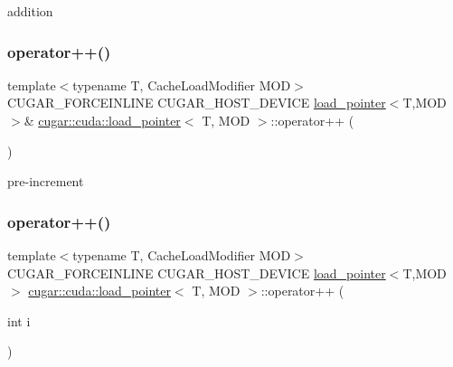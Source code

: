 addition \mbox{\label{structcugar_1_1cuda_1_1load__pointer_a404a1717ac8b334bdc235f523023a7a4}} 
\subsubsection{\texorpdfstring{operator++()}{operator++()}\hspace{0.1cm}{\footnotesize\ttfamily [1/2]}}
{\footnotesize\ttfamily template$<$typename T, Cache\+Load\+Modifier M\+OD$>$ \\
C\+U\+G\+A\+R\+\_\+\+F\+O\+R\+C\+E\+I\+N\+L\+I\+NE C\+U\+G\+A\+R\+\_\+\+H\+O\+S\+T\+\_\+\+D\+E\+V\+I\+CE \hyperlink{structcugar_1_1cuda_1_1load__pointer}{load\+\_\+pointer}$<$T,M\+OD$>$\& \hyperlink{structcugar_1_1cuda_1_1load__pointer}{cugar\+::cuda\+::load\+\_\+pointer}$<$ T, M\+OD $>$\+::operator++ (\begin{DoxyParamCaption}{ }\end{DoxyParamCaption})\hspace{0.3cm}{\ttfamily [inline]}}

pre-\/increment \mbox{\label{structcugar_1_1cuda_1_1load__pointer_ad5e951fdcb006c251a6402d085b77bdf}} 
\subsubsection{\texorpdfstring{operator++()}{operator++()}\hspace{0.1cm}{\footnotesize\ttfamily [2/2]}}
{\footnotesize\ttfamily template$<$typename T, Cache\+Load\+Modifier M\+OD$>$ \\
C\+U\+G\+A\+R\+\_\+\+F\+O\+R\+C\+E\+I\+N\+L\+I\+NE C\+U\+G\+A\+R\+\_\+\+H\+O\+S\+T\+\_\+\+D\+E\+V\+I\+CE \hyperlink{structcugar_1_1cuda_1_1load__pointer}{load\+\_\+pointer}$<$T,M\+OD$>$ \hyperlink{structcugar_1_1cuda_1_1load__pointer}{cugar\+::cuda\+::load\+\_\+pointer}$<$ T, M\+OD $>$\+::operator++ (\begin{DoxyParamCaption}\item[{int}]{i }\end{DoxyParamCaption})\hspace{0.3cm}{\ttfamily [inline]}}

